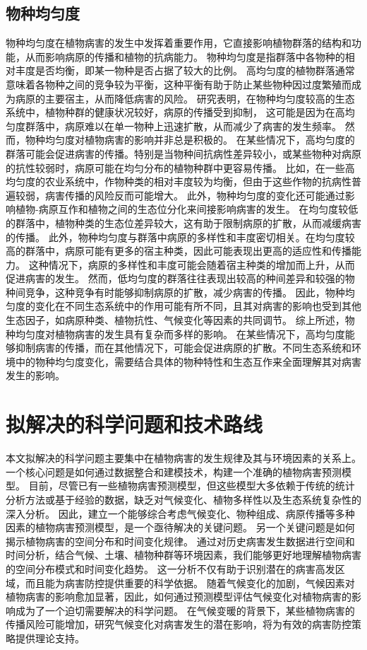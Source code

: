 \documentclass[AutoFakeBold]{LZUThesis-PgD&PhD}
\begin{document}
\subsection{物种均匀度}
物种均匀度在植物病害的发生中发挥着重要作用，它直接影响植物群落的结构和功能，从而影响病原的传播和植物的抗病能力。
物种均匀度是指群落中各物种的相对丰度是否均衡，即某一物种是否占据了较大的比例。
高均匀度的植物群落通常意味着各物种之间的竞争较为平衡，这种平衡有助于防止某些物种因过度繁殖而成为病原的主要宿主，从而降低病害的风险。
研究表明，在物种均匀度较高的生态系统中，植物种群的健康状况较好，病原的传播受到抑制，
这可能是因为在高均匀度群落中，病原难以在单一物种上迅速扩散，从而减少了病害的发生频率\cite{Mitchell2002}。
然而，物种均匀度对植物病害的影响并非总是积极的。
在某些情况下，高均匀度的群落可能会促进病害的传播。特别是当物种间抗病性差异较小，或某些物种对病原的抗性较弱时，病原可能在均匀分布的植物种群中更容易传播。
比如，在一些高均匀度的农业系统中，作物种类的相对丰度较为均衡，但由于这些作物的抗病性普遍较弱，病害传播的风险反而可能增大\cite{Garrett2006}。
此外，物种均匀度的变化还可能通过影响植物-病原互作和植物之间的生态位分化来间接影响病害的发生。
在均匀度较低的群落中，植物种类的生态位差异较大，这有助于限制病原的扩散，从而减缓病害的传播。
此外，物种均匀度与群落中病原的多样性和丰度密切相关。在均匀度较高的群落中，病原可能有更多的宿主种类，因此可能表现出更高的适应性和传播能力。
这种情况下，病原的多样性和丰度可能会随着宿主种类的增加而上升，从而促进病害的发生\cite{Bever2010}。
然而，低均匀度的群落往往表现出较高的种间差异和较强的物种间竞争，这种竞争有时能够抑制病原的扩散，减少病害的传播。
因此，物种均匀度的变化在不同生态系统中的作用可能有所不同，且其对病害的影响也受到其他生态因子，如病原种类、植物抗性、气候变化等因素的共同调节。
综上所述，物种均匀度对植物病害的发生具有复杂而多样的影响。
在某些情况下，高均匀度能够抑制病害的传播，而在其他情况下，可能会促进病原的扩散。不同生态系统和环境中的物种均匀度变化，需要结合具体的物种特性和生态互作来全面理解其对病害发生的影响\cite{Pautasso2010,Maron2011}。


\section{拟解决的科学问题和技术路线}
本文拟解决的科学问题主要集中在植物病害的发生规律及其与环境因素的关系上。
一个核心问题是如何通过数据整合和建模技术，构建一个准确的植物病害预测模型。
目前，尽管已有一些植物病害预测模型，但这些模型大多依赖于传统的统计分析方法或基于经验的数据，缺乏对气候变化、植物多样性以及生态系统复杂性的深入分析。
因此，建立一个能够综合考虑气候变化、物种组成、病原传播等多种因素的植物病害预测模型，是一个亟待解决的关键问题。
另一个关键问题是如何揭示植物病害的空间分布和时间变化规律。
通过对历史病害发生数据进行空间和时间分析，结合气候、土壤、植物种群等环境因素，我们能够更好地理解植物病害的空间分布模式和时间变化趋势。
这一分析不仅有助于识别潜在的病害高发区域，而且能为病害防控提供重要的科学依据。
随着气候变化的加剧，气候因素对植物病害的影响愈加显著，因此，如何通过预测模型评估气候变化对植物病害的影响成为了一个迫切需要解决的科学问题。
在气候变暖的背景下，某些植物病害的传播风险可能增加，研究气候变化对病害发生的潜在影响，将为有效的病害防控策略提供理论支持。
\end{document}
